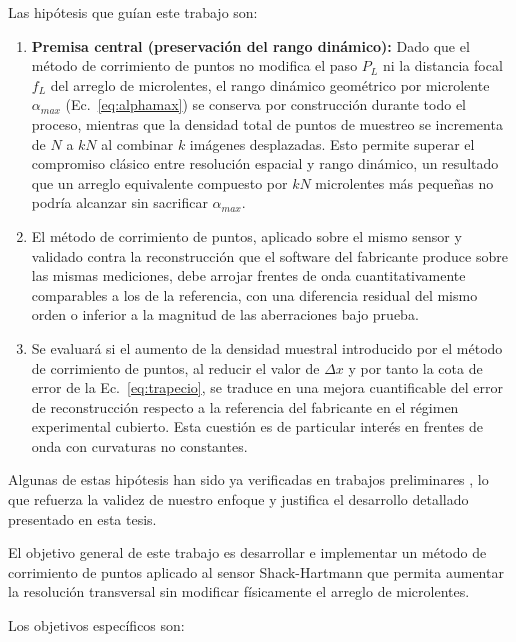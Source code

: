 \documentclass[letterpaper,12pt,oneside]{book}
\begin{document}
Las hipótesis que guían este trabajo son:

\begin{enumerate}
	\item \textbf{Premisa central (preservación del rango dinámico):} Dado que el método de corrimiento de puntos no modifica el paso $P_L$ ni la distancia focal $f_L$ del arreglo de microlentes, el rango dinámico geométrico por microlente $\alpha_{max}$ (Ec.~\ref{eq:alphamax}) se conserva por construcción durante todo el proceso, mientras que la densidad total de puntos de muestreo se incrementa de $N$ a $kN$ al combinar $k$ imágenes desplazadas. Esto permite superar el compromiso clásico entre resolución espacial y rango dinámico, un resultado que un arreglo equivalente compuesto por $kN$ microlentes más pequeñas no podría alcanzar sin sacrificar $\alpha_{max}$.

	\item El método de corrimiento de puntos, aplicado sobre el mismo sensor y validado contra la reconstrucción que el software del fabricante produce sobre las mismas mediciones, debe arrojar frentes de onda cuantitativamente comparables a los de la referencia, con una diferencia residual del mismo orden o inferior a la magnitud de las aberraciones bajo prueba.

	\item Se evaluará si el aumento de la densidad muestral introducido por el método de corrimiento de puntos, al reducir el valor de $\Delta x$ y por tanto la cota de error de la Ec.~\ref{eq:trapecio}, se traduce en una mejora cuantificable del error de reconstrucción respecto a la referencia del fabricante en el régimen experimental cubierto. Esta cuestión es de particular interés en frentes de onda con curvaturas no constantes.
\end{enumerate}

Algunas de estas hipótesis han sido ya verificadas en trabajos preliminares
\cite{SHWS_scan}, lo que refuerza la validez de nuestro enfoque y justifica el desarrollo
detallado presentado en esta tesis.

El objetivo general de este trabajo es desarrollar e implementar un método de corrimiento
de puntos aplicado al sensor Shack-Hartmann que permita aumentar la resolución transversal
sin modificar físicamente el arreglo de microlentes.

Los objetivos específicos son:
\end{document}
